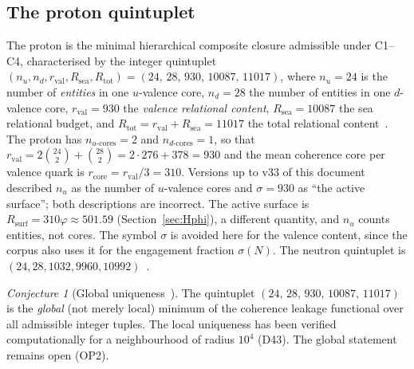 \documentclass[11pt,a4paper]{article}
\theoremstyle{plain}
\theoremstyle{definition}
\theoremstyle{remark}
\newtheorem{conjecture}[theorem]{Conjecture}
\newcommand{\quintuplet}{(24,\,28,\,930,\,10087,\,11017)}
\newcommand{\rval}{r_{\mathrm{val}}}
\newcommand{\Rsurf}{R_{\mathrm{surf}}}
\newcommand{\sigmaN}{\sigma(N)}
\begin{document}
\subsection{The proton quintuplet}
\label{subsec:quintuplet}
The proton is the minimal hierarchical composite closure admissible under C1--C4, characterised by the integer quintuplet $(n_u, n_d, \rval, R_{\mathrm{sea}}, R_{\mathrm{tot}}) = \quintuplet$, where $n_u=24$ is the number of \emph{entities} in one $u$-valence core, $n_d=28$ the number of entities in one $d$-valence core, $\rval=930$ the \emph{valence relational content}, $R_{\mathrm{sea}}=10087$ the sea relational budget, and $R_{\mathrm{tot}}=\rval+R_{\mathrm{sea}}=11017$ the total relational content~\cite{D01,D16,D16a,D16b}. The proton has $n_{u\text{-cores}}=2$ and $n_{d\text{-cores}}=1$, so that $\rval=2\binom{24}{2}+\binom{28}{2}=2\cdot276+378=930$ and the mean coherence core per valence quark is $r_{\mathrm{core}}=\rval/3=310$. \textcolor{negativered}{Versions up to v33 of this document described $n_u$ as the number of $u$-valence cores and $\sigma=930$ as ``the active surface''; both descriptions are incorrect. The active surface is $\Rsurf=310\varphi\approx501.59$ (Section~\ref{sec:Hphi}), a different quantity, and $n_u$ counts entities, not cores. The symbol $\sigma$ is avoided here for the valence content, since the corpus also uses it for the engagement fraction $\sigmaN$.} The neutron quintuplet is $(24,28,1032,9960,10992)$~\cite{D22}.

\begin{conjecture}[Global uniqueness~\cite{D16,D16b}]
\label{conj:uniqueness}
The quintuplet $\quintuplet$ is the \emph{global} (not merely local) minimum of the coherence leakage functional over all admissible integer tuples. The local uniqueness has been verified computationally for a neighbourhood of radius $10^4$ (D43). The global statement remains open (OP2).
\end{conjecture}
\end{document}
